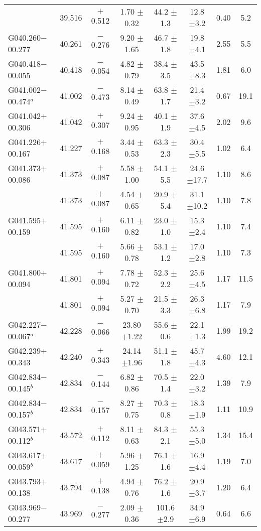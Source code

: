 \begin{ThreePartTable}
\begin{longtable}{lccccccc}
                      &39.516&$+$0.512&1.70	$\pm$0.32&44.2	$\pm$1.3	&12.8	$\pm$3.2	&0.40	&5.2\\
G040.260$-$00.277     &40.261&$-$0.276&9.20	$\pm$1.65&46.7	$\pm$1.8	&19.8	$\pm$4.1	&2.55	&5.5\\
G040.418$-$00.055     &40.418&$-$0.054&4.82	$\pm$0.79&38.4	$\pm$3.5	&43.5	$\pm$8.3	&1.81	&6.0\\
G041.002$-$00.474$^a$ &41.002&$-$0.473&8.14	$\pm$0.49&63.8	$\pm$1.7	&21.4	$\pm$3.2	&0.67	&19.1\\
G041.042$+$00.306     &41.042&$+$0.307&9.24	$\pm$0.95&40.1	$\pm$1.9	&37.6	$\pm$4.5	&2.02	&9.6\\
G041.226$+$00.167     &41.227&$+$0.168&3.44	$\pm$0.53&63.3	$\pm$2.3	&30.4	$\pm$5.5	&1.02	&6.4\\
G041.373$+$00.086     &41.373&$+$0.087&5.58	$\pm$1.00&54.1	$\pm$5.5	&24.6	$\pm$17.7	&1.10	&8.6\\
                      &41.373&$+$0.087&4.54	$\pm$0.65&20.9	$\pm$5.4	&31.1	$\pm$10.2	&1.10	&7.8\\
G041.595$+$00.159     &41.595&$+$0.160&6.11	$\pm$0.82&23.0	$\pm$1.0	&15.3	$\pm$2.4	&1.10	&7.4\\
                      &41.595&$+$0.160&5.66	$\pm$0.78&53.1	$\pm$1.2	&17.0	$\pm$2.8	&1.10	&7.3\\
G041.800$+$00.094     &41.801&$+$0.094&7.78	$\pm$0.72&52.3	$\pm$2.2	&25.6	$\pm$4.5	&1.17	&11.5\\
                      &41.801&$+$0.094&5.27	$\pm$0.70&21.5	$\pm$3.3	&26.3	$\pm$6.8	&1.17	&7.9\\
G042.227$-$00.067$^a$ &42.228&$-$0.066&23.80	$\pm$1.22&55.6	$\pm$0.6	&22.1	$\pm$1.3	&1.99	&19.2\\
G042.239$+$00.343     &42.240&$+$0.343&24.14	$\pm$1.96&51.1	$\pm$1.8	&45.7	$\pm$4.3	&4.60	&12.1\\
G042.834$-$00.145$^b$ &42.834&$-$0.144&6.82	$\pm$0.86&70.5	$\pm$1.4	&22.0	$\pm$3.2	&1.39	&7.9\\
G042.834$-$00.157$^b$ &42.834&$-$0.157&8.27	$\pm$0.75&70.3	$\pm$0.8	&18.3	$\pm$1.9	&1.11	&10.9\\
G043.571$+$00.112$^b$ &43.572&$+$0.112&8.11	$\pm$0.63&84.3	$\pm$2.1	&55.3	$\pm$5.0	&1.34	&15.4\\
G043.617$+$00.059$^b$ &43.617&$+$0.059&5.96	$\pm$1.25&76.1	$\pm$1.6	&16.9	$\pm$4.4	&1.19	&7.0\\
G043.793$+$00.138     &43.794&$+$0.138&4.94	$\pm$0.76&76.2	$\pm$1.6	&20.9	$\pm$3.7	&1.20	&6.4\\
G043.969$-$00.277     &43.969&$-$0.277&2.09	$\pm$0.36&101.6	$\pm$2.9	&34.9	$\pm$6.9	&0.64	&6.6\\

\end{longtable}
\end{ThreePartTable}
